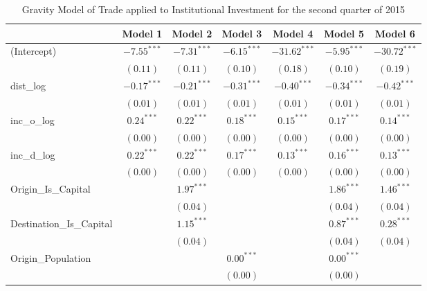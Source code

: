 \begin{table}
	\begin{center}
		\small
		\caption[Gravity Model of trade for Q2 2015]{Gravity Model of Trade applied to Institutional Investment for the second quarter of 2015}
		\begin{tabular}{l c c c c c c }
			\hline
			& Model 1 & Model 2 & Model 3 & Model 4 & Model 5 & Model 6 \\
			\hline
			(Intercept)                  & $-7.55^{***}$ & $-7.31^{***}$ & $-6.15^{***}$ & $-31.62^{***}$ & $-5.95^{***}$ & $-30.72^{***}$ \\
			& $(0.11)$      & $(0.11)$      & $(0.10)$      & $(0.18)$       & $(0.10)$      & $(0.19)$       \\
			dist\_log                    & $-0.17^{***}$ & $-0.21^{***}$ & $-0.31^{***}$ & $-0.40^{***}$  & $-0.34^{***}$ & $-0.42^{***}$  \\
			& $(0.01)$      & $(0.01)$      & $(0.01)$      & $(0.01)$       & $(0.01)$      & $(0.01)$       \\
			inc\_o\_log                  & $0.24^{***}$  & $0.22^{***}$  & $0.18^{***}$  & $0.15^{***}$   & $0.17^{***}$  & $0.14^{***}$   \\
			& $(0.00)$      & $(0.00)$      & $(0.00)$      & $(0.00)$       & $(0.00)$      & $(0.00)$       \\
			inc\_d\_log                  & $0.22^{***}$  & $0.22^{***}$  & $0.17^{***}$  & $0.13^{***}$   & $0.16^{***}$  & $0.13^{***}$   \\
			& $(0.00)$      & $(0.00)$      & $(0.00)$      & $(0.00)$       & $(0.00)$      & $(0.00)$       \\
			Origin\_Is\_Capital          &               & $1.97^{***}$  &               &                & $1.86^{***}$  & $1.46^{***}$   \\
			&               & $(0.04)$      &               &                & $(0.04)$      & $(0.04)$       \\
			Destination\_Is\_Capital     &               & $1.15^{***}$  &               &                & $0.87^{***}$  & $0.28^{***}$   \\
			&               & $(0.04)$      &               &                & $(0.04)$      & $(0.04)$       \\
			Origin\_Population           &               &               & $0.00^{***}$  &                & $0.00^{***}$  &                \\
			&               &               & $(0.00)$      &                & $(0.00)$      &                \\

\end{tabular}
\end{center}
\end{table}
